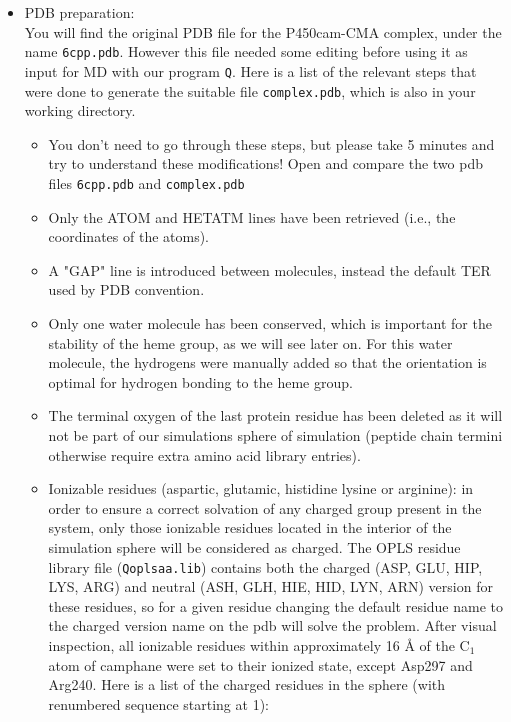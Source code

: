 \documentclass[a4paper,12pt]{article}
\newcommand{\q}{\texttt{Q}}
\begin{document}
\begin {itemize}
\item PDB preparation:\\
You will find the original PDB file for the P450cam-CMA complex,
under the name \texttt{6cpp.pdb}. However this file needed some
editing before using it as input for MD with our program {\q}.
Here is a list of the relevant steps that were done to generate
the suitable file \texttt{complex.pdb}, which is also in your
working directory.
    \begin {itemize}
    \item You don't need to go through these steps, but please take 5 minutes and try to understand these modifications! Open and compare the two pdb files \texttt{6cpp.pdb} and \texttt{complex.pdb}
    \item Only the ATOM and HETATM lines have been retrieved (i.e., the coordinates of the atoms).
    \item A "GAP" line is introduced between molecules, instead the default TER used by PDB convention.
    \item Only one water molecule has been conserved, which is important for the stability of the heme group, as we will see later on. For this water molecule, the hydrogens were manually added so that the orientation is optimal for hydrogen bonding to the heme group.
    \item The terminal oxygen of the last protein residue has been deleted as it will not be part of our simulations sphere of simulation
          (peptide chain termini otherwise require extra amino acid library entries).
    \item Ionizable residues (aspartic, glutamic, histidine lysine or arginine): in order to ensure a correct solvation of 
          any charged group present in the system, only those ionizable residues located in the interior of the simulation sphere 
          will be considered as charged. The OPLS residue library file (\texttt{Qoplsaa.lib}) contains both the charged 
          (ASP, GLU, HIP, LYS, ARG) and neutral (ASH, GLH, HIE, HID, LYN, ARN) version for these residues, 
          so for a given residue changing the default residue name to the charged version name on the pdb will solve the problem. After visual inspection, all ionizable residues within approximately 16 {\AA} of the C$_1$ atom of camphane were set to their ionized state, except Asp297 and Arg240. Here is a list of the charged residues in the sphere (with renumbered sequence starting at 1):\\
        \begin {itemize}

\end{itemize}
\end{itemize}
\end{itemize}
\end{document}
